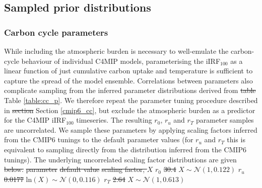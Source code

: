 \documentclass[gmd, manuscript]{copernicus}
\providecommand{\DIFadd}[1]{{\protect\color{blue}#1}} %
\providecommand{\DIFdel}[1]{{\protect\color{red}\sout{#1}}}                      %
\providecommand{\DIFaddbegin}{} %
\providecommand{\DIFaddend}{} %
\providecommand{\DIFdelbegin}{} %
\providecommand{\DIFdelend}{} %
\begin{document}
\subsection{Sampled prior distributions} \label{NROY_priors}
\subsubsection{Carbon cycle parameters} \label{cc_sampling}
While including the atmospheric burden is necessary to well-emulate the carbon-cycle behaviour of individual C4MIP models, parameterising the iIRF$_{100}$ as a linear function of just cumulative carbon uptake and temperature is sufficient to capture the spread of the model ensemble. Correlations between parameters also complicate sampling from the inferred parameter distributions derived from \DIFdelbegin \DIFdel{table }\DIFdelend \DIFaddbegin \DIFadd{Table }\DIFaddend \ref{table:cc_p}. We therefore repeat the parameter tuning procedure described in \DIFdelbegin \DIFdel{section }\DIFdelend \DIFaddbegin \DIFadd{Section }\DIFaddend \ref{cmip6_cc}, but exclude the atmospheric burden as a predictor for the C4MIP iIRF$_{100}$ timeseries. The resulting $r_0$, $r_u$ and $r_T$ parameter samples are uncorrelated. We sample these parameters by applying scaling factors inferred from the CMIP6 tunings to the default parameter values (for $r_u$ and $r_T$ this is equivalent to sampling directly from the distribution inferred from the CMIP6 tunings). The underlying uncorrelated scaling factor distributions are given \DIFdelbegin \DIFdel{below.
}%
\DIFdel{parameter}%
\DIFdel{default value }%
\DIFdel{scaling factor, $X$}%
\DIFdel{$r_0$ }%
\DIFdel{30.4 }%
\DIFdel{$X\sim\mathcal{N}\left(1,0.122\right)$ }%
\DIFdel{$r_u$   }%
\DIFdel{0.0177 }%
\DIFdel{$\mathrm{ln}(X)\sim\mathcal{N}\left(0,0.116\right)$ }%
\DIFdel{$r_T$         }%
\DIFdel{2.64 }%
\DIFdel{$X\sim\mathcal{N}\left(1,0.613\right)$ }%
\end{document}
